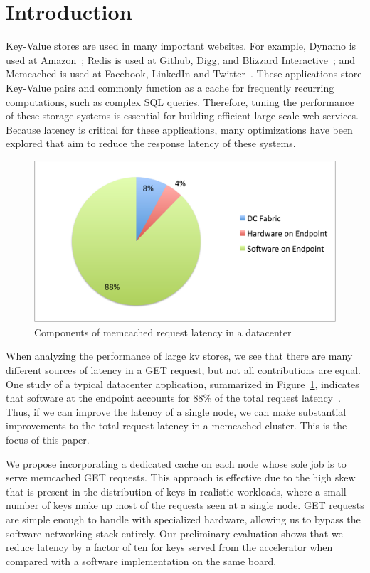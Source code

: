 \section{Introduction}

Key-Value stores are used in many important websites. For example, Dynamo is
used at Amazon~\cite{dynamo}; Redis is used at Github, Digg, and Blizzard
Interactive~\cite{Reddi10}; and Memcached is used at Facebook, LinkedIn and
Twitter~\cite{memcached, Petrovic08}. These applications store Key-Value pairs
and commonly function as a cache for frequently recurring computations, such as
complex SQL queries. Therefore, tuning the performance of these storage systems
is essential for building efficient large-scale web services. Because latency
is critical for these applications, many optimizations have been explored that
aim to reduce the response latency of these systems. 

\begin{figure}[b]
\begin{center}
\includegraphics[width=\linewidth]{softwarelag.pdf}
\caption{Components of memcached request latency in a datacenter}
\label{fig:lag}
\end{center}
\end{figure}

When analyzing the performance of large kv stores, we see that there are many
different sources of latency in a GET request, but not all contributions are
equal. One study of a typical datacenter application, summarized in
Figure~\ref{fig:lag}, indicates that software at the endpoint accounts for
$88\%$ of the total request latency~\cite{Kapoor2012}. Thus, if we can improve
the latency of a single node, we can make substantial improvements to the
total request latency in a memcached cluster. This is the focus of this paper.

We propose incorporating a dedicated cache on each node whose sole job is to
serve memcached GET requests. This approach is effective due to the high skew
that is present in the distribution of keys in realistic workloads, where a
small number of keys make up most of the requests seen at a single node. GET
requests are simple enough to handle with specialized hardware, allowing us to
bypass the software networking stack entirely. Our preliminary evaluation shows
that we reduce latency by a factor of ten for keys served from the accelerator
when compared with a software implementation on the same board.
